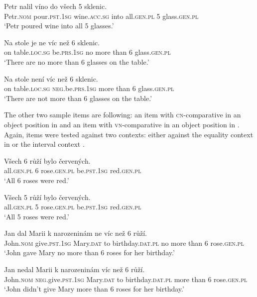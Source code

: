 \documentclass[output=paper,
]{langscibook}
\begin{document}
\ea  
\gll Petr nalil víno do všech 5 sklenic.\\
Petr.\textsc{nom} pour.\textsc{pst.1sg} wine.\textsc{acc.sg} into all.\textsc{gen.pl} 5 glass.\textsc{gen.pl}\\\hfill{}
\glt `Petr poured wine into all 5 glasses.' \label{ex:wine_n}
\z

\ea 
\gll Na stole je ne víc než 6 sklenic.\label{ex:pcn}\\
on table.\textsc{loc.sg} be.\textsc{prs.1sg} no more than 6 glass.\textsc{gen.pl}\\\hfill {}
\glt `There are no more than 6 glasses on the table.'
\z

\ea
\gll Na stole není víc než 6 sklenic.\label{ex:pvn}\\
on table.\textsc{loc.sg} \textsc{neg}.be.\textsc{prs.1sg} more than 6 glass.\textsc{gen.pl}\\\hfill {}
\glt `There are not more than 6 glasses on the table.'
\z


\noindent The other two sample items are following: an item with \textsc{cn-}comparative in an object position in  and an item with \textsc{vn-}comparative in an object position in . Again, items were tested against two contexts: either against the equality context in  or the interval context . 

\ea 
\gll Všech 6 růží bylo červených.\\
all.\textsc{gen.pl} 6 rose.\textsc{gen.pl} be.\textsc{pst.1sg} red.\textsc{gen.pl}\\\hfill{}
\glt `All 6 roses were red.'  \label{ex:rose_e}
\z

\ea 
\gll Všech 5 růží bylo červených.\\
all.\textsc{gen.pl} 5 rose.\textsc{gen.pl} be.\textsc{pst.1sg} red.\textsc{gen.pl}\\\hfill{}
\glt `All 5 roses were red.'  \label{ex:rose_n}
\z

\ea
\gll Jan dal Marii k narozeninám ne víc než 6 růží.\label{ex:ocn}\\
John.\textsc{nom} give.\textsc{pst.1sg} Mary.\textsc{dat} to birthday.\textsc{dat.pl} no more than 6 rose.\textsc{gen.pl}\\\hfill {}
\glt `John gave Mary no more than 6 roses for her birthday.'
\z

\ea
\gll Jan nedal Marii k narozeninám víc než 6 růží.\label{ex:ovn}\\
John.\textsc{nom} \textsc{neg}.give.\textsc{pst.1sg} Mary.\textsc{dat} to birthday.\textsc{dat.pl} more than 6 rose.\textsc{gen.pl}\\\hfill{}
\glt`John didn't give Mary more than 6 roses for her birthday.'
\z
\end{document}
